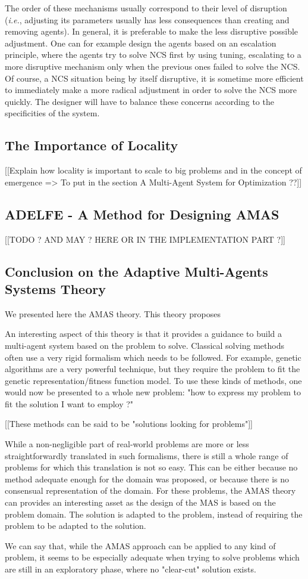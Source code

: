 The order of these mechanisms usually correspond to their level of disruption (\textit{i.e.}, adjusting its parameters usually has less consequences than creating and removing agents). In general, it is preferable to make the less disruptive possible adjustment. One can for example design the agents based on an escalation principle, where the agents try to solve NCS first by using tuning, escalating to a more disruptive mechanism only when the previous ones failed to solve the NCS. Of course, a NCS situation being by itself disruptive, it is sometime more efficient to immediately make a more radical adjustment in order to solve the NCS more quickly. The designer will have to balance these concerns according to the specificities of the system.

\subsection{The Importance of Locality}
[[Explain how locality is important to scale to big problems and in the concept of emergence => To put in the section A Multi-Agent System for Optimization ??]]

\subsection{ADELFE - A Method for Designing AMAS} 
[[TODO ? AND MAY ? HERE OR IN THE IMPLEMENTATION PART ?]]

\subsection{Conclusion on the Adaptive Multi-Agents Systems Theory}

We presented here the AMAS theory. This theory proposes 

An interesting aspect of this theory  is that it provides a guidance to build a multi-agent system based on the problem to solve. Classical solving methods often use a very rigid formalism which needs to be followed. For example, genetic algorithms are a very powerful technique, but they require the problem to fit the genetic representation/fitness function model. To use these kinds of methods, one would now be presented to a whole new problem: "how to express my problem to fit the solution I want to employ ?"

[[These methods can be said to be "solutions looking for problems"]]

While a non-negligible part of real-world problems are more or less straightforwardly translated in such formalisms, there is still a whole range of problems for which this translation is not so easy. This can be either because no method adequate enough for the domain was proposed, or because there is no consensual representation of the domain. For these problems, the AMAS theory can provides an interesting asset as the design of the MAS is based on the problem domain. The solution is adapted to the problem, instead of requiring the problem to be adapted to the solution.

We can say that, while the AMAS approach can be applied to any kind of problem, it seems to be especially adequate when trying to solve problems which are still in an exploratory phase, where no "clear-cut" solution exists.


